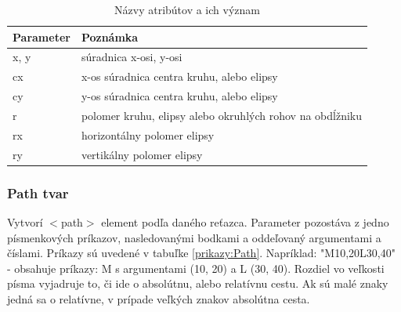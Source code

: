 \begin{table}[tp]
	\begin{center}
		\begin{tabular}{|l|l|}
			\hline \textbf{Parameter} & \textbf{Poznámka} \\ 
			\hline
			\hline x, y & súradnica x-osi, y-osi  \\ 
			
			\hline cx & x-os súradnica centra kruhu, alebo elipsy \\ 
			\hline cy & y-os súradnica centra kruhu, alebo elipsy \\ 
			\hline r & polomer kruhu, elipsy alebo okruhlých rohov na obdĺžniku \\ 
			\hline rx & horizontálny polomer elipsy \\ 
			\hline ry & vertikálny polomer elipsy \\ 
			
			\hline
		\end{tabular} 
		
	\end{center}
	\caption{Názvy atribútov a ich význam}
	\label{parametre:tvar}
\end{table}



\subsubsection{Path tvar}
Vytvorí $<$path$>$ element podľa daného reťazca. Parameter pozostáva z jedno písmenkových príkazov, nasledovanými bodkami a oddeľovaný argumentami a číslami. Príkazy sú uvedené v tabuľke \ref{prikazy:Path}.
Napríklad: "M10,20L30,40" - obsahuje príkazy: M s argumentami (10, 20) a L (30, 40). Rozdiel vo veľkosti písma vyjadruje to, či ide o absolútnu, alebo relatívnu cestu. Ak sú malé znaky jedná sa o relatívne, v prípade veľkých znakov absolútna cesta. 



